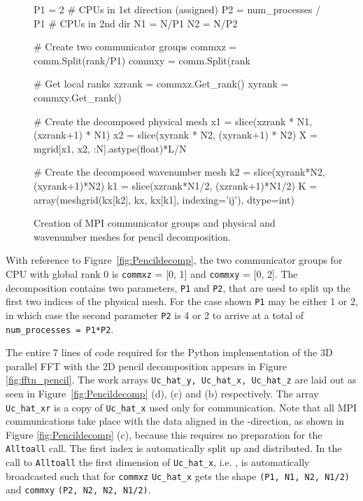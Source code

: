 \documentclass[final,3p,times,twocolumn]{elsarticle}
\newcommand{\inpyth}{\lstinline[style=inlinestyle]}
\begin{document}
\begin{figure}
\begin{python}
P1 = 2  # CPUs in 1st direction (assigned)
P2 = num_processes / P1 # CPUs in 2nd dir
N1 = N/P1
N2 = N/P2

# Create two communicator groups
commxz = comm.Split(rank/P1)
commxy = comm.Split(rank

# Get local ranks
xzrank = commxz.Get_rank()
xyrank = commxy.Get_rank()

# Create the decomposed physical mesh
x1 = slice(xzrank * N1, (xzrank+1) * N1)
x2 = slice(xyrank * N2, (xyrank+1) * N2)
X = mgrid[x1, x2, :N].astype(float)*L/N

# Create the decomposed wavenumber mesh
k2 = slice(xyrank*N2, (xyrank+1)*N2)
k1 = slice(xzrank*N1/2, (xzrank+1)*N1/2)
K = array(meshgrid(kx[k2], kx, kx[k1], 
          indexing='ij'), dtype=int)
\end{python}
\caption{Creation of MPI communicator groups and physical and wavenumber meshes 
for pencil decomposition.}
\label{fig:pencil_init}
\end{figure}	



With reference to Figure~\ref{fig:Pencildecomp}, the two communicator groups for CPU with global rank 0 is
\inpyth{commxz} = [0, 1] and \inpyth{commxy} = [0, 2]. The decomposition contains two parameters, \inpyth{P1} and \inpyth{P2}, that are used to split up the first two indices of the physical mesh.
For the case shown \inpyth{P1} may be either 1 or 2, in which case the second parameter \inpyth{P2}
is 4 or 2 to arrive at a total of \inpyth{num_processes = P1*P2}.

The entire 7 lines of code required for the Python implementation of the 3D 
parallel FFT 
with the 2D pencil decomposition appears in Figure \ref{fig:fftn_pencil}. The 
work arrays \inpyth{Uc_hat_y, Uc_hat_x, Uc_hat_z} are laid out as seen in 
Figure~\ref{fig:Pencildecomp} (d), (c) and (b) respectively. The array
\inpyth{Uc_hat_xr} is a copy of \inpyth{Uc_hat_x} used only for communication. 
Note that all MPI communications take place with the data aligned in the 
-direction, as shown in Figure \ref{fig:Pencildecomp} (c), because this 
requires no preparation for the \inpyth{Alltoall} call. The first
index is automatically split up and distributed.  In the call to 
\inpyth{Alltoall} the first dimension of \inpyth{Uc_hat_x}, i.e. , is 
automatically broadcasted such that for \inpyth{commxz} \inpyth{Uc_hat_x}
gets the shape \inpyth{(P1, N1, N2, N1/2)} and \inpyth{commxy} \inpyth{(P2, N2, N2, N1/2)}.
\end{document}
